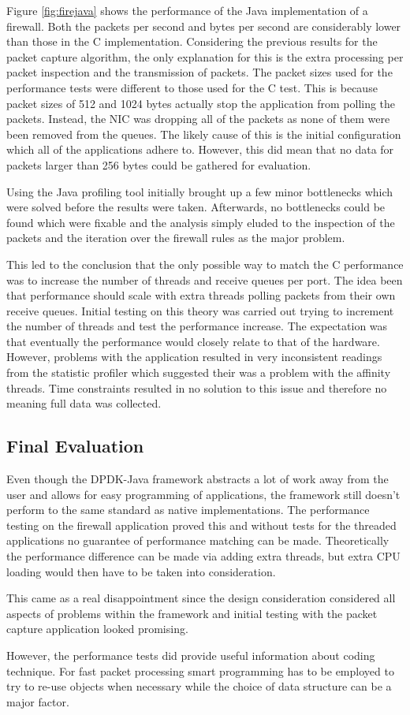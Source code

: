\documentclass[final_report.tex]{subfiles}
\begin{document}
Figure \ref{fig:firejava} shows the performance of the Java implementation of a firewall. Both the packets per second and bytes per second are considerably lower than those in the C implementation. Considering the previous results for the packet capture algorithm, the only explanation for this is the extra processing per packet inspection and the transmission of packets. The packet sizes used for the performance tests were different to those used for the C test. This is because packet sizes of 512 and 1024 bytes actually stop the application from polling the packets. Instead, the NIC was dropping all of the packets as none of them were been removed from the queues. The likely cause of this is the initial configuration which all of the applications adhere to. However, this did mean that no data for packets larger than 256 bytes could be gathered for evaluation.

Using the Java profiling tool initially brought up a few minor bottlenecks which were solved before the results were taken. Afterwards, no bottlenecks could be found which were fixable and the analysis simply eluded to the inspection of the packets and the iteration over the firewall rules as the major problem.

This led to the conclusion that the only possible way to match the C performance was to increase the number of threads and receive queues per port. The idea been that performance should scale with extra threads polling packets from their own receive queues. Initial testing on this theory was carried out trying to increment the number of threads and test the performance increase. The expectation was that eventually the performance would closely relate to that of the hardware. However, problems with the application resulted in very inconsistent readings from the statistic profiler which suggested their was a problem with the affinity threads. 
Time constraints resulted in no solution to this issue and therefore no meaning full data was collected.

\subsection{Final Evaluation}
Even though the DPDK-Java framework abstracts a lot of work away from the user and allows for easy programming of applications, the framework still doesn't perform to the same standard as native implementations. The performance testing on the firewall application proved this and without tests for the threaded applications no guarantee of performance matching can be made. Theoretically the performance difference can be made via adding extra threads, but extra CPU loading would then have to be taken into consideration.

This came as a real disappointment since the design consideration considered all aspects of problems within the framework and initial testing with the packet capture application looked promising.

However, the performance tests did provide useful information about coding technique. For fast packet processing smart programming has to be employed to try to re-use objects when necessary while the choice of data structure can be a major factor.
\end{document}
